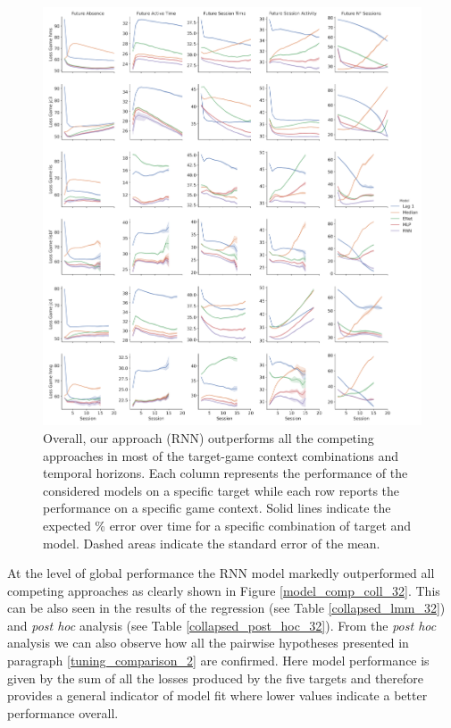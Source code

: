 \begin{figure}[h]
\centering
\includegraphics[height=0.7\textheight,keepaspectratio]{images/chapter_3/models_comparison_non_collapsed_32.png}
\caption[\textbf{Model comparison without collapsing}]{ Overall, our approach (RNN) outperforms all the competing approaches in most of the target-game context combinations and temporal horizons. Each column represents the performance of the considered models on a specific target while each row reports the performance on a specific game context. Solid lines indicate the expected \% error over time for a specific combination of target and model. Dashed areas indicate the standard error of the mean.}
\label{model_comp_non_coll_32} 
\end{figure}

At the level of global performance the RNN model markedly outperformed all competing approaches as clearly shown in Figure \ref{model_comp_coll_32}. This can be also seen in the results of the regression (see Table \ref{collapsed_lmm_32}) and  \textit{post hoc} analysis (see Table \ref{collapsed_post_hoc_32}). From the \textit{post hoc} analysis we can also observe how all the pairwise hypotheses presented in paragraph \ref{tuning_comparison_2} are confirmed. Here model performance is given by the sum of all the losses produced by the five targets and therefore provides a general indicator of model fit where lower values indicate a better performance overall.

